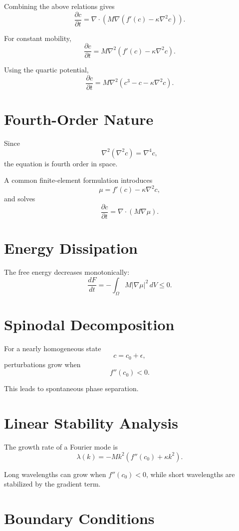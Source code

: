 \documentclass[11pt]{article}
\begin{document}
Combining the above relations gives
\[
\frac{\partial c}{\partial t}
=
\nabla\cdot
\left(
M\nabla
\left(
f'(c)-\kappa\nabla^2 c
\right)
\right).
\]

For constant mobility,
\[
\frac{\partial c}{\partial t}
=
M\nabla^2
\left(
f'(c)-\kappa\nabla^2 c
\right).
\]

Using the quartic potential,
\[
\frac{\partial c}{\partial t}
=
M\nabla^2(c^3-c-\kappa\nabla^2 c).
\]

\section{Fourth-Order Nature}

Since
\[
\nabla^2(\nabla^2 c)=\nabla^4 c,
\]
the equation is fourth order in space.

A common finite-element formulation introduces
\[
\mu=f'(c)-\kappa\nabla^2 c,
\]
and solves
\[
\frac{\partial c}{\partial t}
=
\nabla\cdot(M\nabla\mu).
\]

\section{Energy Dissipation}

The free energy decreases monotonically:
\[
\frac{dF}{dt}
=
-\int_\Omega M|\nabla\mu|^2\,dV
\le 0.
\]

\section{Spinodal Decomposition}

For a nearly homogeneous state
\[
c=c_0+\epsilon,
\]
perturbations grow when
\[
f''(c_0)<0.
\]

This leads to spontaneous phase separation.

\section{Linear Stability Analysis}

The growth rate of a Fourier mode is
\[
\lambda(k)
=
-Mk^2
\left(
f''(c_0)+\kappa k^2
\right).
\]

Long wavelengths can grow when \(f''(c_0)<0\), while short wavelengths are stabilized by the gradient term.

\section{Boundary Conditions}
\end{document}
